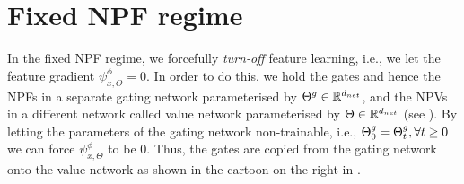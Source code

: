 \section{Fixed NPF regime}
In the fixed NPF regime, we forcefully \emph{turn-off} feature learning, i.e., we let the feature gradient $\psi^{\phi}_{x,\Theta}=0$. In order to do this, we hold the gates and hence the NPFs in a separate gating network parameterised by ${\Theta}^g\in\mathbb{R}^{d_{net}}$, and the NPVs in a different network called value network parameterised by $\Theta\in\mathbb{R}^{d_{net}}$ (see ). By letting the parameters of the gating network non-trainable, i.e., ${\Theta}^g_0={\Theta}^g_t,\forall t\geq 0$ we can force $\psi^{\phi}_{x,\Theta}$ to be $0$. Thus, the gates are copied from the gating network onto the value network as shown in the cartoon on the right in .
\begin{table}[h] 
\begin{minipage}{0.75\columnwidth}
\end{minipage}
\begin{minipage}{0.24\columnwidth}
\end{minipage}
\end{table}
